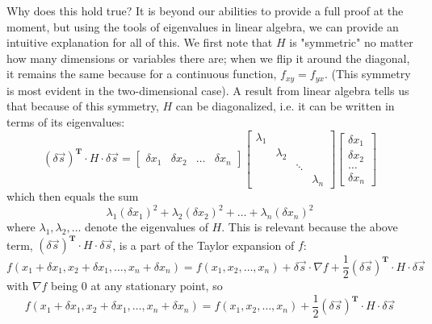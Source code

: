 \documentclass{article}
\begin{document}
Why does this hold true? It is beyond our abilities to provide a full proof at the moment, but using the tools of eigenvalues in linear algebra, we can provide an intuitive explanation for all of this. We first note that $H$ is "symmetric" no matter how many dimensions or variables there are; when we flip it around the diagonal, it remains the same because for a continuous function, $f_{xy}=f_{yx}$. (This symmetry is most evident in the two-dimensional case). A result from linear algebra tells us that because of this symmetry, $H$ can be diagonalized, i.e. it can be written in terms of its eigenvalues:
\begin{equation*}
    (\delta \vec{s})^{\mathbf{T}}\cdot H\cdot \delta\vec{s} = \begin{bmatrix}
        \delta x_1 & \delta x_2 & \dots & \delta x_n 
    \end{bmatrix}\begin{bmatrix}
        \lambda_1 & & & \\
        & \lambda_2 & & \\
        & & \ddots & \\
        & & & \lambda_n
    \end{bmatrix}\begin{bmatrix}
        \delta x_1 \\ \delta x_2 \\ \dots \\ \delta x_n 
    \end{bmatrix}
\end{equation*}
which then equals the sum
\begin{equation*}
    \lambda_1(\delta x_1)^2+\lambda_2(\delta x_2)^2 + \dots + \lambda_n(\delta x_n)^2
\end{equation*}
where $\lambda_1, \lambda_2, \dots$ denote the eigenvalues of $H$. This is relevant because the above term, $(\delta \vec{s})^{\mathbf{T}}\cdot H\cdot \delta\vec{s}$, is a part of the Taylor expansion of $f$:
\begin{equation*}
    f(x_1+\delta x_1, x_2+\delta x_1, \dots, x_n+\delta x_n) =f(x_1, x_2, \dots, x_n) + \delta\vec{s} \cdot \nabla f +  \frac{1}{2} (\delta \vec{s})^{\mathbf{T}}\cdot H\cdot \delta\vec{s}
\end{equation*}
with $\nabla f$ being 0 at any stationary point, so 
\begin{equation*}
    f(x_1+\delta x_1, x_2+\delta x_1, \dots, x_n+\delta x_n) =f(x_1, x_2, \dots, x_n) + \frac{1}{2} (\delta \vec{s})^{\mathbf{T}}\cdot H\cdot \delta\vec{s}
\end{equation*}
\end{document}
